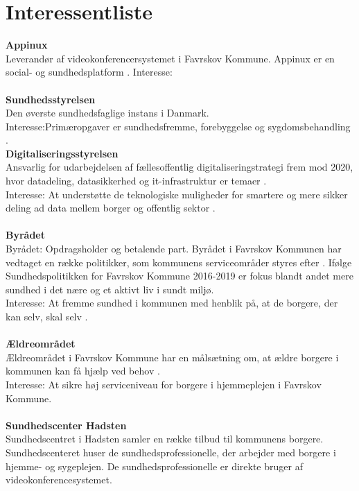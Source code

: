 \section{Interessentliste}
\textbf{Appinux}\\
 Leverandør af videokonferencersystemet i Favrskov Kommune. Appinux er en social- og sundhedsplatform \cite{appinuxwebsite}.
Interesse: \\ \\
\textbf{Sundhedsstyrelsen}\\
Den øverste sundhedsfaglige instans i Danmark.\\ Interesse:Primæropgaver er sundhedsfremme, forebyggelse og sygdomsbehandling \cite{sstyr}.\\

\textbf{Digitaliseringsstyrelsen}\\
Ansvarlig for udarbejdelsen af fællesoffentlig digitaliseringstrategi frem mod 2020, hvor datadeling, datasikkerhed og it-infrastruktur er temaer \cite{digst1}.\\
Interesse: At understøtte de teknologiske muligheder for smartere og mere sikker deling ad data mellem borger og offentlig sektor \cite{digst2}.\\ \\
\textbf{Byrådet}\\
Byrådet: Opdragsholder og betalende part. Byrådet i Favrskov Kommunen har vedtaget en række politikker, som kommunens serviceområder styres efter \cite{favrskovkommune}. Ifølge Sundhedspolitikken for Favrskov Kommune 2016-2019 er fokus blandt andet mere sundhed i det nære og et aktivt liv i sundt miljø.\\
Interesse: At fremme sundhed i kommunen med henblik på, at de borgere, der kan selv, skal selv \cite{favrskovkommune2}.\\ \\
\textbf{Ældreområdet}\\
Ældreområdet i Favrskov Kommune har en målsætning om, at ældre borgere i kommunen kan få hjælp ved behov \cite{favrskovkommune3}.\\
Interesse: At sikre høj serviceniveau for borgere i hjemmeplejen i Favrskov Kommune. \\ \\
\textbf{Sundhedscenter Hadsten}\\
Sundhedscentret i Hadsten samler en række tilbud til kommunens borgere. Sundhedscenteret huser de sundhedsprofessionelle, der arbejder med borgere i hjemme- og sygeplejen. De sundhedsprofessionelle er direkte bruger af videokonferencesystemet.\\
